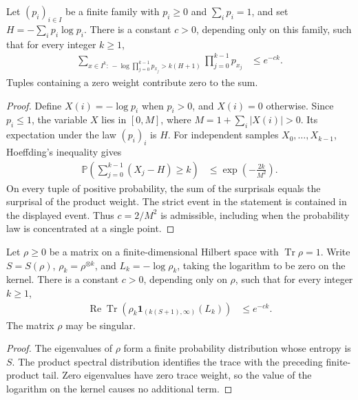 \begin{theorem}
    \label{thm:iid_surprisal_exponential_finite_law}
    \leanok
    Let $(p_i)_{i\in I}$ be a finite family with $p_i\ge0$ and
    $\sum_i p_i=1$, and set $H=-\sum_i p_i\log p_i$. There is a constant
    $c>0$, depending only on this family, such that for every integer $k\ge1$,
    \begin{align*}
        \sum_{x\in I^k:\,-\log\prod_{j=0}^{k-1} p_{x_j}>k(H+1)}
        \prod_{j=0}^{k-1} p_{x_j}
         & \le e^{-ck}.
    \end{align*}
    Tuples containing a zero weight contribute zero to the sum.
\end{theorem}
\begin{proof}\leanok
    Define $X(i)=-\log p_i$ when $p_i>0$, and $X(i)=0$ otherwise. Since
    $p_i\le1$, the variable $X$ lies in $[0,M]$, where
    $M=1+\sum_i|X(i)|>0$. Its expectation under the law $(p_i)_i$ is $H$.
    For independent samples $X_0,\ldots,X_{k-1}$, Hoeffding's inequality gives
    \begin{align*}
        \mathbb P\!\left(\sum_{j=0}^{k-1}(X_j-H)\ge k\right)
         & \le \exp\!\left(-\frac{2k}{M^2}\right).
    \end{align*}
    On every tuple of positive probability, the sum of the surprisals equals
    the surprisal of the product weight. The strict event in the statement is
    contained in the displayed event. Thus $c=2/M^2$ is admissible, including
    when the probability law is concentrated at a single point.
\end{proof}

\begin{theorem}
    \label{thm:iid_surprisal_exponential_density}
    \leanok
    Let $\rho\ge0$ be a matrix on a finite-dimensional Hilbert space with
    $\operatorname{Tr}\rho=1$. Write $S=S(\rho)$,
    $\rho_k=\rho^{\otimes k}$, and $L_k=-\log\rho_k$, taking the logarithm
    to be zero on the kernel. There is a constant $c>0$, depending only on
    $\rho$, such that for every integer $k\ge1$,
    \begin{align*}
        \operatorname{Re}\operatorname{Tr}\!\left(
        \rho_k\mathbf1_{(k(S+1),\infty)}(L_k)\right)
         & \le e^{-ck}.
    \end{align*}
    The matrix $\rho$ may be singular.
\end{theorem}
\begin{proof}\leanok
    The eigenvalues of $\rho$ form a finite probability distribution whose
    entropy is $S$. The product spectral distribution identifies the trace
    with the preceding finite-product tail. Zero eigenvalues have zero trace
    weight, so the value of the logarithm on the kernel causes no additional
    term.
\end{proof}

